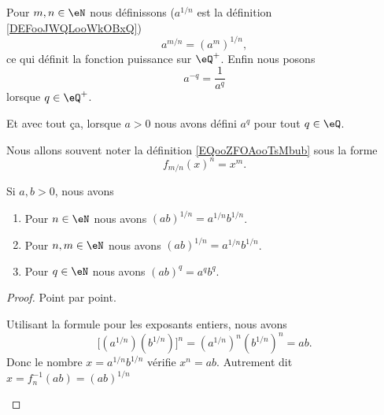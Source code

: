 \begin{definition}      \label{DEFooHXUFooOJTVXA}
    Pour \( m,n\in \eN\) nous définissons (\( a^{1/n}\) est la définition \ref{DEFooJWQLooWkOBxQ})
	\begin{equation}        \label{EQooZFOAooTsMbub}
		a^{m/n}=(a^m)^{1/n},
	\end{equation}
	ce qui définit la fonction puissance sur \( \eQ^+\). Enfin nous posons
	\begin{equation}        \label{DEFooTUCVooXikxRh}
		a^{-q}=\frac{1}{ a^q }
	\end{equation}
	lorsque \( q\in \eQ^+\).

	Et avec tout ça, lorsque \( a>0\) nous avons défini \( a^q\) pour tout \( q\in \eQ\).
\end{definition}

Nous allons souvent noter la définition \eqref{EQooZFOAooTsMbub} sous la forme
\begin{equation}        \label{EQooZIKKooVfjkZo}
	f_{m/n}(x)^n=x^m.
\end{equation}

\begin{lemma}        \label{LEMooOFPMooIEmSNA}
    Si \( a,b >0\), nous avons
    \begin{enumerate}
        \item       \label{ITEMooEFUAooYBeJza}
            Pour \( n\in \eN\) nous avons \( (ab)^{1/n}=a^{1/n}b^{1/n}\).
        \item       \label{ITEMooHGPPooDBzWKx}
            Pour \( n,m\in \eN\) nous avons \( (ab)^{1/n}=a^{1/n}b^{1/n}\).
        \item       \label{ITEMooUYTLooHzXwtf}
            Pour \(q\in \eN\) nous avons \( (ab)^{q}=a^{q}b^{q}\).
    \end{enumerate}
\end{lemma}

\begin{proof}
    Point par point.
    \begin{subproof}
        Utilisant la formule pour les exposants entiers, nous avons
        \begin{equation}
            \Big[ (a^{1/n})(b^{1/n}) \Big]^n=(a^{1/n})^n(b^{1/n})^n=ab.
        \end{equation}
        Donc le nombre \( x=a^{1/n}b^{1/n}\) vérifie \( x^n=ab\). Autrement dit \( x=f_n^{-1}(ab)=(ab)^{1/n}\)
     
        
    \end{subproof}
    
\end{proof}


